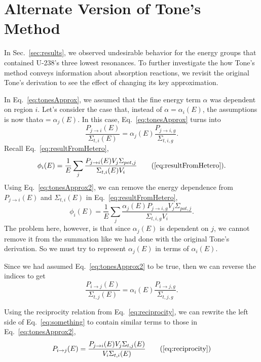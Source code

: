 \documentclass[10pt]{article}
\begin{document}
\section{Alternate Version of Tone's Method}
In Sec.~\ref{sec:results}, we observed undesirable behavior for the energy groups that contained U-238's three lowest resonances. To further investigate the how Tone's method conveys information about absorption reactions, we revisit the original Tone's derivation to see the effect of changing its key approximation.\par
In Eq.~\ref{eq:tonesApprox}, we assumed that the fine energy term $\alpha$ was dependent on region $i$. Let's consider the case that, instead of $\alpha=\alpha_i(E)$, the assumptions is now that$\alpha=\alpha_j(E)$. In this case, Eq.~\ref{eq:tonesApprox} turns into
\begin{equation}\frac{P_{j\rightarrow i}(E)}{\Sigma_{t,i}(E)}=\alpha_{j}(E)\frac{P_{j\rightarrow i,g}}{\Sigma_{t,i,g}}\label{eq:tonesApprox2}.\end{equation}
Recall Eq.~\ref{eq:resultFromHetero},
\begin{equation*}\phi_{i}(E)=\frac{1}{E}\sum\limits_j\frac{P_{j\rightarrow i}(E)V_{j}\Sigma_{pot,j}}{\Sigma_{t,i}(E)V_{i}}\tag{\ref{eq:resultFromHetero}}.\end{equation*}
  Using Eq.~\ref{eq:tonesApprox2}, we can remove the energy dependence from $P_{j\rightarrow i}(E)$ and $\Sigma_{t,i}(E)$ in Eq.~\ref{eq:resultFromHetero},
\begin{equation}\phi_{i}(E)=\frac{1}{E}\sum\limits_j\frac{\alpha_j(E)P_{j\rightarrow i,g}V_{j}\Sigma_{pot,j}}{\Sigma_{t,i,g}V_{i}}.\label{eq:phiWithalphaj}\end{equation}
The problem here, however, is that since $\alpha_j(E)$ is dependent on $j$, we cannot remove it from the summation like we had done with the original Tone's derivation. So we must try to represent $\alpha_j(E)$ in terms of $\alpha_i(E)$.

Since we had assumed Eq.~\ref{eq:tonesApprox2} to be true, then we can reverse the indices to get
\begin{equation}\frac{P_{i\rightarrow j}(E)}{\Sigma_{t,j}(E)}=\alpha_{i}(E)\frac{P_{i\rightarrow j,g}}{\Sigma_{t,j,g}}\label{eq:something}.\end{equation}

Using the reciprocity relation from Eq.~\ref{eq:reciprocity}, we can rewrite the left side of Eq.~\ref{eq:something} to contain similar terms to those in Eq.~\ref{eq:tonesApprox2},
\begin{equation}P_{i\rightarrow j}(E)=\frac{P_{j\rightarrow i}(E)V_{j}\Sigma_{t,j}(E)}{V_{i}\Sigma_{t,i}(E)}\tag{\ref{eq:reciprocity}}\end{equation}
\end{document}
